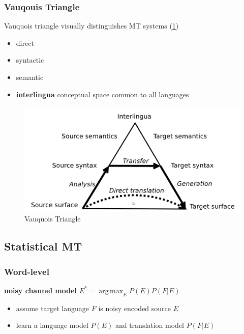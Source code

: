 \documentclass[]{article}
\DeclareMathOperator*{\argmax}{arg\,max}
\theoremstyle{definition}
\begin{document}
\subsubsection{Vauqouis Triangle}%
\label{ssub:vauqouis_triangle}

Vauquois triangle visually distinguishes MT systems (\ref{fig:vauquois})
\begin{itemize}
    \item direct
    \item syntactic
    \item semantic
    \item \textbf{interlingua} conceptual space common to all languages
\end{itemize}
\begin{figure}[h]
    \centering
    \includegraphics[width=0.8\linewidth]{comp550/vauquois.png}
    \caption{Vauquois Triangle}%
    \label{fig:vauquois}
\end{figure}



\subsection{Statistical MT}%
\label{sub:statistical_mt}

\subsubsection{Word-level}%
\label{ssub:word_level}

\textbf{noisy channel model} $E^* = \argmax_E P(E) P(F|E)$
\begin{itemize}
    \item assume target language $F$ is noisy encoded source $E$
    \item learn a language model $P(E)$ and translation model $P(F|E)$
\end{itemize}
\end{document}
